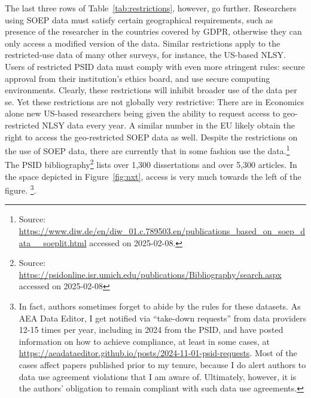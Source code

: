 \documentclass{article}
\begin{document}
The last three rows of  Table~\ref{tab:restrictions}, however, go further. Researchers using SOEP data must satisfy certain geographical requirements, such as presence of the researcher in the countries covered by \ac{GDPR}, otherwise they can only access a modified version of the data. Similar restrictions apply to the restricted-use data of many other surveys, for instance, the US-based \ac{NLSY}. Users of restricted PSID data must comply with even more stringent rules: secure approval from their institution's ethics board, and use secure computing environments. Clearly, these restrictions will inhibit broader use of the data per se. Yet these restrictions are not globally very restrictive: There are in Economics alone \economicsgrads{} new US-based researchers being given the ability to request access to geo-restricted NLSY data every year. A similar number in the EU likely obtain the right to access the geo-restricted SOEP data as well. Despite the restrictions on the use of SOEP data, there are currently \soeppapers{} that in some fashion use the data.\footnote{Source: \url{https://www.diw.de/en/diw_01.c.789503.en/publications_based_on_soep_data__soeplit.html} accessed on 2025-02-08.} 
The PSID bibliography\footnote{Source: \url{https://psidonline.isr.umich.edu/publications/Bibliography/search.aspx} accessed on 2025-02-08} lists over 1,300 dissertations and over 5,300 articles.
In the space depicted in Figure~\ref{fig:nxt}, access is very much towards the left of the figure.%
%
\footnote{In fact, authors sometimes forget to abide by the rules for these datasets. As AEA Data Editor, I get notified via ``take-down requests'' from data providers 12-15 times per year, including in 2024 from the PSID, and have posted information on how to achieve compliance, at least in some cases, at \url{https://aeadataeditor.github.io/posts/2024-11-01-psid-requests}. Most of the cases affect papers published prior to my tenure, because I do alert authors to  data use agreement violations that I am aware of. Ultimately, however, it is the authors' obligation to remain compliant with such data use agreements.}. 
\end{document}
